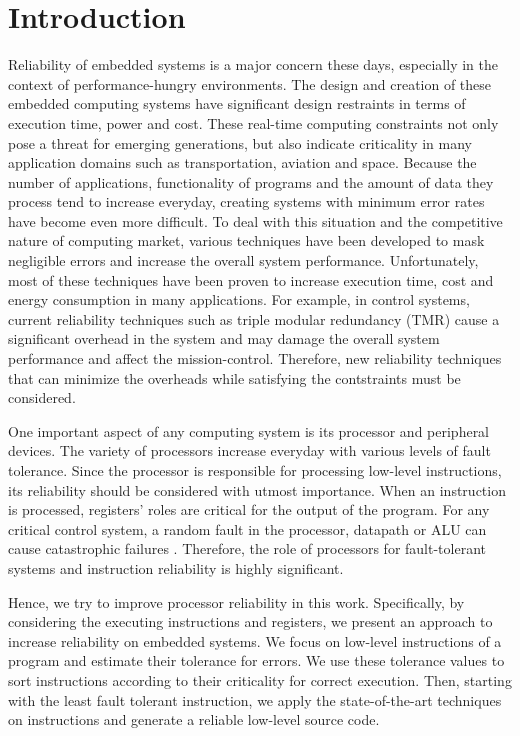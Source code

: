 \section{Introduction}
Reliability of embedded systems is a major concern these days, especially in the context of performance-hungry environments. The design and creation of these embedded computing systems have significant design restraints in terms of execution time, power and cost. These real-time computing constraints not only pose a threat for emerging generations, but also indicate criticality in many application domains such as transportation, aviation and space. Because the number of applications, functionality of programs and the amount of data they process tend to increase everyday, creating systems with minimum error rates have become even more difficult. To deal with this situation and the competitive nature of computing market, various techniques have been developed to mask negligible errors and increase the overall system performance. Unfortunately, most of these techniques have been proven to increase execution time, cost and energy consumption in many applications. For example, in control systems, current reliability techniques such as triple modular redundancy (TMR) \cite{TMR:1962} cause a significant overhead in the system and may damage the overall system performance and affect the mission-control. Therefore, new reliability techniques that can minimize the overheads while satisfying the contstraints must be considered. 

One important aspect of any computing system is its processor and peripheral devices. The variety of processors increase everyday with various levels of fault tolerance. Since the processor is responsible for processing low-level instructions, its reliability should be considered with utmost importance. When an instruction is processed, registers' roles are critical for the output of the program. For any critical control system, a random fault in the processor, datapath or ALU can cause catastrophic failures \cite{Yuan:2014}. Therefore, the role of processors for fault-tolerant systems and instruction reliability is highly significant. 

Hence, we try to improve processor reliability in this work. Specifically, by considering the executing instructions and registers, we present an approach to increase reliability on embedded systems. We focus on low-level instructions of a program and estimate their tolerance for errors. We use these tolerance values to sort instructions according to their criticality for correct execution. Then, starting with the least fault tolerant instruction, we apply the state-of-the-art techniques on instructions and generate a reliable low-level source code. 

